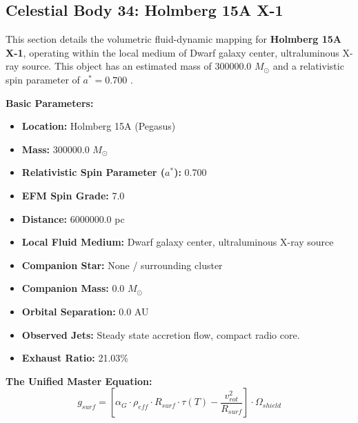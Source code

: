 \documentclass[11pt, a4paper]{article}
\begin{document}
\clearpage
\subsection{Celestial Body 34: Holmberg 15A X-1}
This section details the volumetric fluid-dynamic mapping for \textbf{Holmberg 15A X-1}, operating within the local medium of Dwarf galaxy center, ultraluminous X-ray source. This object has an estimated mass of 300000.0 $M_{\odot}$ and a relativistic spin parameter of $a^* = 0.700$ \cite{wiersema2015, ned}.

\vspace{0.5em}
\noindent \textbf{Basic Parameters:}
\begin{itemize}
  \item \textbf{Location:} Holmberg 15A (Pegasus)
  \item \textbf{Mass:} 300000.0 $M_{\odot}$
  \item \textbf{Relativistic Spin Parameter ($a^*$):} 0.700
  \item \textbf{EFM Spin Grade:} 7.0
  \item \textbf{Distance:} 6000000.0 pc
  \item \textbf{Local Fluid Medium:} Dwarf galaxy center, ultraluminous X-ray source
  \item \textbf{Companion Star:} None / surrounding cluster
  \item \textbf{Companion Mass:} 0.0 $M_{\odot}$
  \item \textbf{Orbital Separation:} 0.0 AU
  \item \textbf{Observed Jets:} Steady state accretion flow, compact radio core.
  \item \textbf{Exhaust Ratio:} 21.03\%
\end{itemize}

\vspace{0.5em}
\noindent \textbf{The Unified Master Equation:}
$$ g_{surf} = \left[ \alpha_G \cdot \rho_{eff} \cdot R_{surf} \cdot \tau(T) - \frac{v_{rot}^2}{R_{surf}} \right] \cdot \Omega_{shield} $$
\end{document}
